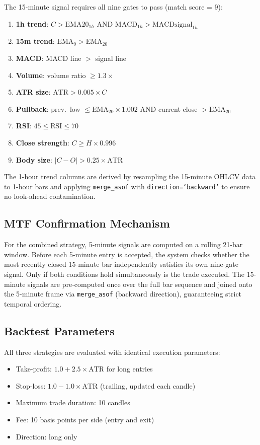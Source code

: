 \documentclass[conference]{IEEEtran}
\begin{document}
The 15-minute signal requires all nine gates to pass
(match score = 9):
\begin{enumerate}
  \item \textbf{1h trend}: $C > \mathrm{EMA20}_{1h}$ AND $\mathrm{MACD}_{1h} >
        \mathrm{MACDsignal}_{1h}$
  \item \textbf{15m trend}: $\mathrm{EMA}_9 > \mathrm{EMA}_{20}$
  \item \textbf{MACD}: MACD line $>$ signal line
  \item \textbf{Volume}: volume ratio $\geq 1.3\times$
  \item \textbf{ATR size}: $\mathrm{ATR} > 0.005 \times C$
  \item \textbf{Pullback}: prev.\ low $\leq \mathrm{EMA}_{20} \times 1.002$
        AND current close $> \mathrm{EMA}_{20}$
  \item \textbf{RSI}: $45 \leq \mathrm{RSI} \leq 70$
  \item \textbf{Close strength}: $C \geq H \times 0.996$
  \item \textbf{Body size}: $|C - O| > 0.25 \times \mathrm{ATR}$
\end{enumerate}

The 1-hour trend columns are derived by resampling the
15-minute OHLCV data to 1-hour bars and applying
\texttt{merge\_asof} with \texttt{direction=`backward'} to
ensure no look-ahead contamination.

\subsection{MTF Confirmation Mechanism}

For the combined strategy, 5-minute signals are computed
on a rolling 21-bar window. Before each 5-minute entry is
accepted, the system checks whether the most recently
closed 15-minute bar independently satisfies its own
nine-gate signal. Only if both conditions hold
simultaneously is the trade executed. The 15-minute
signals are pre-computed once over the full bar sequence
and joined onto the 5-minute frame via \texttt{merge\_asof}
(backward direction), guaranteeing strict temporal
ordering.

\subsection{Backtest Parameters}

All three strategies are evaluated with identical
execution parameters:
\begin{itemize}
  \item Take-profit: $1.0 + 2.5 \times \mathrm{ATR}$ for long entries
  \item Stop-loss: $1.0 - 1.0 \times \mathrm{ATR}$ (trailing, updated each candle)
  \item Maximum trade duration: 10 candles
  \item Fee: 10 basis points per side (entry and exit)
  \item Direction: long only
\end{itemize}
\end{document}
